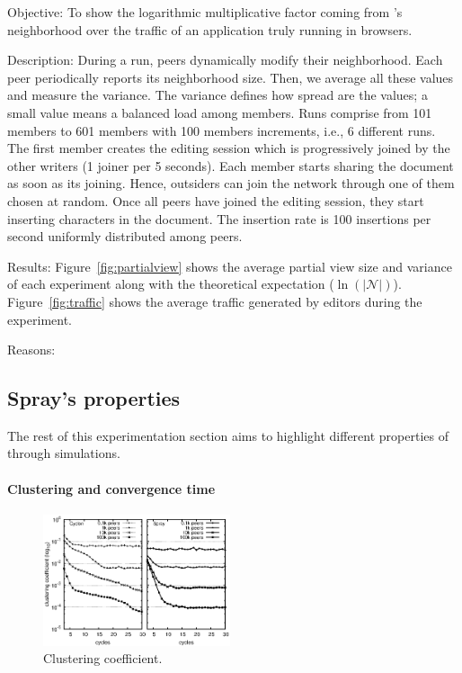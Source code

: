 \begin{asparadesc}
\item [Objective:] To show the logarithmic multiplicative factor coming from
  \SPRAY's neighborhood over the traffic of an application truly running in
  browsers.
\item [Description:] During a run, peers dynamically modify their
  neighborhood. Each peer periodically reports its neighborhood size. Then, we
  average all these values and measure the variance. The variance defines how
  spread are the values; a small value means a balanced load among members. Runs
  comprise from 101 members to 601 members with 100 members increments, i.e., 6
  different runs.  The first member creates the editing session which is
  progressively joined by the other writers (1 joiner per 5 seconds). Each
  member starts sharing the document as soon as its joining. Hence, outsiders
  can join the network through one of them chosen at random. Once all peers have
  joined the editing session, they start inserting characters in the
  document. The insertion rate is 100 insertions per second uniformly
  distributed among peers.
\item [Results:] Figure~\ref{fig:partialview} shows the average partial view
  size and variance of each experiment along with the theoretical expectation
  ($\ln(|\mathcal{N}|)$). Figure~\ref{fig:traffic} shows the average traffic
  generated by editors during the experiment.  
\item [Reasons:]
\end{asparadesc}


\subsection{Spray's properties}

The rest of this experimentation section aims to highlight different properties
of \SPRAY through simulations.

\paragraph{Clustering and convergence time}

\begin{figure}
  \centering
  \includegraphics[width=0.49\textwidth]{img/simple.eps}
  \caption{\label{fig:clustering}Clustering coefficient.}
\end{figure}

